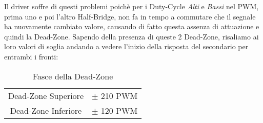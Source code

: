 \noindent
Il driver soffre di questi problemi poichè per i Duty-Cycle \textit{Alti} e \textit{Bassi} nel PWM, prima uno e poi l'altro Half-Bridge, non fa in tempo a commutare che il segnale ha nuovamente cambiato valore, causando di fatto questa assenza di attuazione e quindi la Dead-Zone. Sapendo della presenza di queste 2 Dead-Zone, risaliamo ai loro valori di soglia andando a vedere l'inizio della risposta del secondario per entrambi i fronti:\vspace{-4mm}
\begin{table}[H]
	\centering
	\caption[Fasce della Dead-Zone]{Fasce della Dead-Zone}
	\begin{tabular}[t]{||c r||}
		\hline
		Dead-Zone Superiore & $\pm$ 210 PWM  \\
		Dead-Zone Inferiore & $\pm$ 120  PWM \\
		\hline
	\end{tabular}
\end{table}